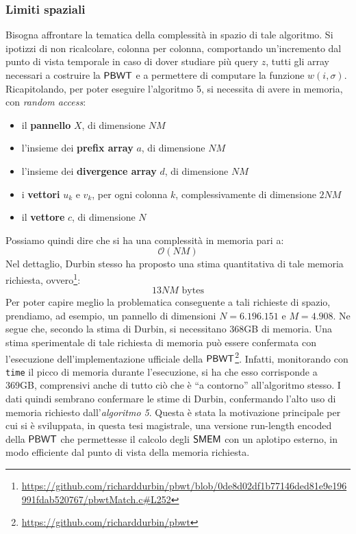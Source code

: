 \subsubsection{Limiti spaziali}
Bisogna affrontare la tematica della complessità in spazio di tale
algoritmo. Si ipotizzi di non ricalcolare, colonna per colonna, comportando
un'incremento dal punto di vista temporale in caso di dover studiare più query
$z$, tutti gli array  
necessari a costruire la $\mbox{\rm {\sf PBWT}}$ e a permettere di computare la funzione
$w(i,\sigma)$.\\
Ricapitolando, per poter eseguire l'algoritmo 5, si necessita di avere in
memoria, con \textit{random access}:
\begin{itemize}
  \item il \textbf{pannello} $X$, di dimensione $NM$
  \item l'insieme dei \textbf{prefix array} $a$, di dimensione $NM$
  \item l'insieme dei \textbf{divergence array} $d$, di dimensione $NM$
  \item i \textbf{vettori} $u_k$ e $v_k$, per ogni colonna $k$, complessivamente
  di dimensione $2NM$ 
  \item il \textbf{vettore} $c$, di dimensione $N$
\end{itemize}
Possiamo quindi dire che si ha una complessità in memoria pari a:
\begin{equation}
  \label{eq:pbwtsize}
  \mathcal{O}(NM)
\end{equation}
Nel dettaglio, Durbin stesso ha proposto una stima quantitativa di tale memoria
richiesta,
ovvero\footnote{\scriptsize{\url{https://github.com/richarddurbin/pbwt/blob/0de8d02df1b77146ded81e9e196991fdab520767/pbwtMatch.c\#L252}}}:
\begin{equation}
  \label{eq:pbwtsize2}
  13NM\mbox{ bytes}
\end{equation}
Per poter capire meglio la problematica conseguente a tali richieste di spazio,
prendiamo, ad esempio, un pannello di 
dimensioni $N= 6.196.151$ e $M=4.908$. Ne segue che, secondo la stima
di 
Durbin, si necessitano 368GB di memoria. Una stima
sperimentale di tale richiesta di memoria può essere confermata con l'esecuzione
dell'implementazione ufficiale della
$\mbox{\rm {\sf PBWT}}$\footnote{\url{https://github.com/richarddurbin/pbwt}}. Infatti,
monitorando  
con \texttt{time} il picco di memoria durante l'esecuzione, si ha che esso
corrisponde a 369GB, comprensivi anche di tutto ciò che è ``a
contorno'' all'algoritmo stesso. I dati quindi sembrano confermare le stime di
Durbin, confermando l'alto uso di memoria richiesto dall'\textit{algoritmo
  5}. Questa è 
stata la motivazione principale per cui si è sviluppata, in questa tesi
magistrale, una versione run-length encoded della $\mbox{\rm {\sf PBWT}}$ che permettesse il
calcolo degli $\mbox{\rm {\sf SMEM}}$ con un aplotipo esterno, in modo efficiente dal punto di
vista della memoria richiesta.
